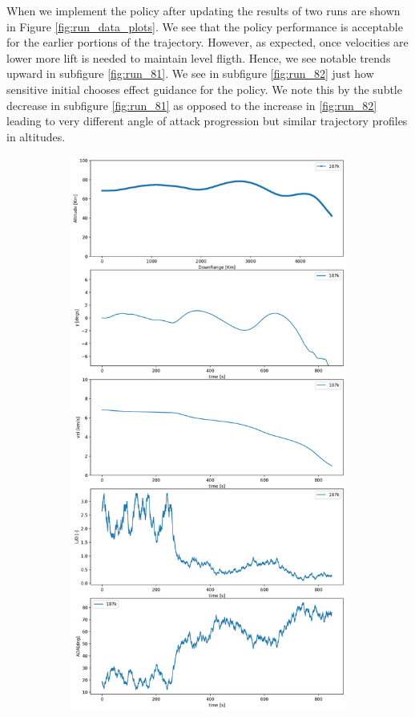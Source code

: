 \documentclass[11pt]{article} %
\begin{document}
When we implement the policy after updating the results of two runs are shown in Figure \ref{fig:run_data_plots}. 
We see that the policy performance is acceptable for the earlier portions of the trajectory. However, as expected,
once velocities are lower more lift is needed to maintain level fligth. Hence, we see notable trends upward 
in subfigure \ref{fig:run_81}. We see in subfigure \ref{fig:run_82} just how sensitive initial chooses effect 
guidance for the policy. We note this by the subtle decrease in subfigure \ref{fig:run_81} as opposed to 
the increase in \ref{fig:run_82} leading to very different angle of attack progression but similar trajectory
profiles in altitudes.

\begin{figure}[H]
   \begin{subfigure}[b]{0.5\textwidth}
     \centering
     \includegraphics[width=\textwidth]{images/run8_explore.png}

\end{subfigure}
\end{figure}
\end{document}

